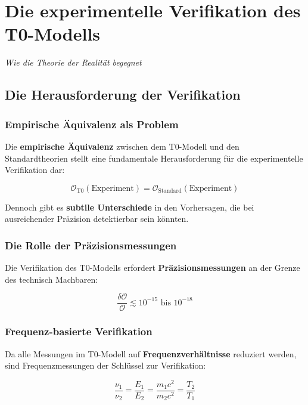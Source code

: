 \documentclass[12pt,a4paper]{report}
\begin{document}
	\chapter{Die experimentelle Verifikation des T0-Modells}
	\textit{Wie die Theorie der Realität begegnet}
	
	\section{Die Herausforderung der Verifikation}
	
	\subsection{Empirische Äquivalenz als Problem}
	
	Die \textbf{empirische Äquivalenz} zwischen dem T0-Modell und den Standardtheorien stellt eine fundamentale Herausforderung für die experimentelle Verifikation dar:
	
	\begin{equation}
		\mathcal{O}_{\text{T0}}(\text{Experiment}) = \mathcal{O}_{\text{Standard}}(\text{Experiment})
	\end{equation}
	
	Dennoch gibt es \textbf{subtile Unterschiede} in den Vorhersagen, die bei ausreichender Präzision detektierbar sein könnten.
	
	\subsection{Die Rolle der Präzisionsmessungen}
	
	Die Verifikation des T0-Modells erfordert \textbf{Präzisionsmessungen} an der Grenze des technisch Machbaren:
	
	\begin{equation}
		\frac{\delta\mathcal{O}}{\mathcal{O}} \lesssim 10^{-15} \text{ bis } 10^{-18}
	\end{equation}
	
	\subsection{Frequenz-basierte Verifikation}
	
	Da alle Messungen im T0-Modell auf \textbf{Frequenzverhältnisse} reduziert werden, sind Frequenzmessungen der Schlüssel zur Verifikation:
	
	\begin{equation}
		\frac{\nu_1}{\nu_2} = \frac{E_1}{E_2} = \frac{m_1 c^2}{m_2 c^2} = \frac{T_2}{T_1}
	\end{equation}
	
\end{document}
